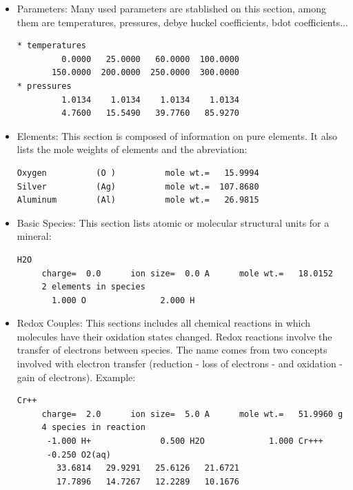 \begin{itemize}
\item Parameters: Many used parameters are stablished on this section, among them are temperatures, pressures, debye huckel coefficients, bdot coefficients...
\begin{lstlisting}[frame=single, caption=Excerpt of the section Parameters]
* temperatures
         0.0000   25.0000   60.0000  100.0000
       150.0000  200.0000  250.0000  300.0000
* pressures
         1.0134    1.0134    1.0134    1.0134
         4.7600   15.5490   39.7760   85.9270
\end{lstlisting}
\item Elements: This section is composed of information on pure elements. It also lists the mole weights of elements and the abreviation: 
\begin{lstlisting}[frame=single, caption=Excerpt of the section Elements]
Oxygen          (O )          mole wt.=   15.9994
Silver          (Ag)          mole wt.=  107.8680
Aluminum        (Al)          mole wt.=   26.9815
\end{lstlisting}
\item Basic Species: This section lists atomic or molecular structural units for a mineral:
\begin{lstlisting}[frame=single, caption=Excerpt of the section Basic Species]
H2O
     charge=  0.0      ion size=  0.0 A      mole wt.=   18.0152
     2 elements in species
       1.000 O               2.000 H
\end{lstlisting}


\item Redox Couples: This sections includes all chemical reactions in which molecules have their oxidation states changed. 
Redox reactions involve the transfer of electrons between species.
The name comes from two concepts involved with electron transfer (reduction - loss of electrons - and oxidation - gain of electrons). Example:

\begin{minipage}[c]{0.92\textwidth}
\begin{lstlisting}[frame=single, caption=Excerpt of the section Redox Couples]
Cr++
     charge=  2.0      ion size=  5.0 A      mole wt.=   51.9960 g
     4 species in reaction
      -1.000 H+              0.500 H2O             1.000 Cr+++
      -0.250 O2(aq)
        33.6814   29.9291   25.6126   21.6721
        17.7896   14.7267   12.2289   10.1676
\end{lstlisting}
\end{minipage}



\end{itemize}

